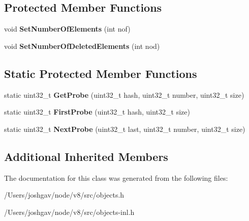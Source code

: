 \subsection*{Protected Member Functions}
\begin{DoxyCompactItemize}
\item 
void {\bfseries Set\+Number\+Of\+Elements} (int nof)\hypertarget{classv8_1_1internal_1_1_hash_table_base_a73d1d12847dea6375c769aa36c54b6a8}{}\label{classv8_1_1internal_1_1_hash_table_base_a73d1d12847dea6375c769aa36c54b6a8}

\item 
void {\bfseries Set\+Number\+Of\+Deleted\+Elements} (int nod)\hypertarget{classv8_1_1internal_1_1_hash_table_base_a03f2719df776dfa5ad846f41f76757b1}{}\label{classv8_1_1internal_1_1_hash_table_base_a03f2719df776dfa5ad846f41f76757b1}

\end{DoxyCompactItemize}
\subsection*{Static Protected Member Functions}
\begin{DoxyCompactItemize}
\item 
static uint32\+\_\+t {\bfseries Get\+Probe} (uint32\+\_\+t hash, uint32\+\_\+t number, uint32\+\_\+t size)\hypertarget{classv8_1_1internal_1_1_hash_table_base_aa259e268c7f58639ab33414e5adb04c4}{}\label{classv8_1_1internal_1_1_hash_table_base_aa259e268c7f58639ab33414e5adb04c4}

\item 
static uint32\+\_\+t {\bfseries First\+Probe} (uint32\+\_\+t hash, uint32\+\_\+t size)\hypertarget{classv8_1_1internal_1_1_hash_table_base_a771b91b666da8b9c60060f2061b2635f}{}\label{classv8_1_1internal_1_1_hash_table_base_a771b91b666da8b9c60060f2061b2635f}

\item 
static uint32\+\_\+t {\bfseries Next\+Probe} (uint32\+\_\+t last, uint32\+\_\+t number, uint32\+\_\+t size)\hypertarget{classv8_1_1internal_1_1_hash_table_base_a14b520de3484f55cc4a726a872f31547}{}\label{classv8_1_1internal_1_1_hash_table_base_a14b520de3484f55cc4a726a872f31547}

\end{DoxyCompactItemize}
\subsection*{Additional Inherited Members}


The documentation for this class was generated from the following files\+:\begin{DoxyCompactItemize}
\item 
/\+Users/joshgav/node/v8/src/objects.\+h\item 
/\+Users/joshgav/node/v8/src/objects-\/inl.\+h\end{DoxyCompactItemize}
